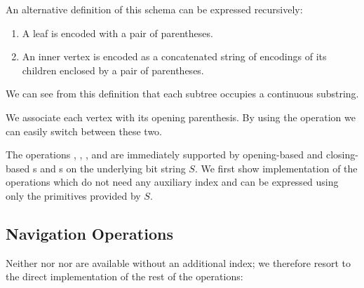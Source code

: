 An alternative definition of this schema can be expressed recursively:
\begin{enumerate}
	\item A leaf is encoded with a pair of parentheses.
	\item An inner vertex is encoded as a concatenated string of encodings of its children enclosed by a pair of parentheses.
\end{enumerate}
We can see from this definition that each subtree occupies a continuous substring.

\bigbreak

We associate each vertex with its opening parenthesis.
By using the operation \match{} we can easily switch between these two.

The operations \preRank{}, \preSelect{}, \postRank{}, and \postSelect{} are immediately supported by opening-based and closing-based \rank{}s and \select{}s on the underlying bit string $S$.
We first show implementation of the operations which do not need any auxiliary index and can be expressed using only the primitives provided by $S$.

\begin{algorithm}
\begin{algorithmic}
	\State {}
\EndFunction
\end{algorithmic}
\end{algorithm}

\begin{algorithm}
\begin{algorithmic}
	\State {} 
\EndFunction
\end{algorithmic}
\end{algorithm}

\subsection{Navigation Operations}

\begin{algorithm}
\begin{algorithmic}
	\State {}
\EndFunction
\end{algorithmic}
\end{algorithm}

Neither \degree{} nor \childRank{} nor \childSelect{} are available without an additional index; we therefore resort to the direct implementation of the rest of the \childAny{} operations:

